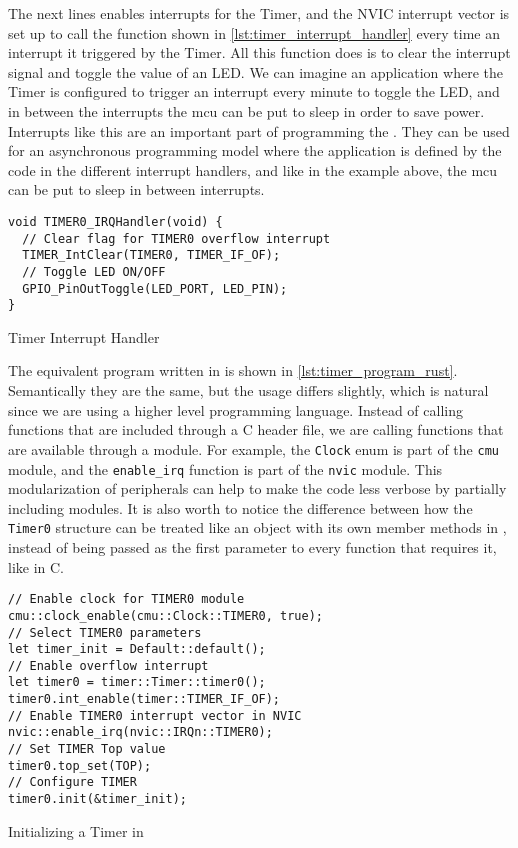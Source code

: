 The next lines enables interrupts for the Timer, and the NVIC interrupt vector is set up to call the function shown in \autoref{lst:timer_interrupt_handler} every time an interrupt it triggered by the Timer.
All this function does is to clear the interrupt signal and toggle the value of an LED.
We can imagine an application where the Timer is configured to trigger an interrupt every minute to toggle the LED, and in between the interrupts the \gls{mcu} can be put to sleep in order to save power.
Interrupts like this are an important part of programming the \gecko.
They can be used for an asynchronous programming model where the application is defined by the code in the different interrupt handlers, and like in the example above, the \gls{mcu} can be put to sleep in between interrupts.

\begin{listing}[h]
\begin{verbatim}
void TIMER0_IRQHandler(void) {
  // Clear flag for TIMER0 overflow interrupt
  TIMER_IntClear(TIMER0, TIMER_IF_OF);
  // Toggle LED ON/OFF
  GPIO_PinOutToggle(LED_PORT, LED_PIN);
}
\end{verbatim}
\caption{Timer Interrupt Handler}
\label{lst:timer_interrupt_handler}
\end{listing}

The equivalent program written in \rust is shown in \autoref{lst:timer_program_rust}.
Semantically they are the same, but the usage differs slightly, which is natural since we are using a higher level programming language.
Instead of calling functions that are included through a C header file, we are calling functions that are available through a \rust module.
For example, the \texttt{Clock} enum is part of the \texttt{cmu} module, and the \texttt{enable\_irq} function is part of the \texttt{nvic} module.
This modularization of peripherals can help to make the code less verbose by partially including modules.
It is also worth to notice the difference between how the \texttt{Timer0} structure can be treated like an object with its own member methods in \rust, instead of being passed as the first parameter to every function that requires it, like in C.

\begin{listing}[h]
\begin{verbatim}
// Enable clock for TIMER0 module
cmu::clock_enable(cmu::Clock::TIMER0, true);
// Select TIMER0 parameters
let timer_init = Default::default();
// Enable overflow interrupt
let timer0 = timer::Timer::timer0();
timer0.int_enable(timer::TIMER_IF_OF);
// Enable TIMER0 interrupt vector in NVIC
nvic::enable_irq(nvic::IRQn::TIMER0);
// Set TIMER Top value
timer0.top_set(TOP);
// Configure TIMER
timer0.init(&timer_init);
\end{verbatim}
\caption{Initializing a Timer in \rust}
\label{lst:timer_program_rust}
\end{listing}

